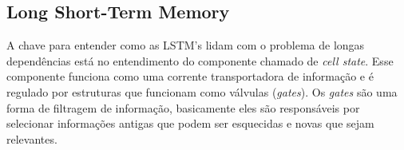 \subsection{Long Short-Term Memory}
\label{sec:LSTM}

A chave para entender como as LSTM's lidam com o problema de longas dependências está no entendimento do componente chamado de \textit{cell state}. Esse componente funciona como uma corrente transportadora de informação e é regulado por estruturas que funcionam como válvulas (\textit{gates}). Os \textit{gates} são uma forma de filtragem de informação, basicamente eles são responsáveis por selecionar informações antigas que podem ser esquecidas e novas que sejam relevantes. 











